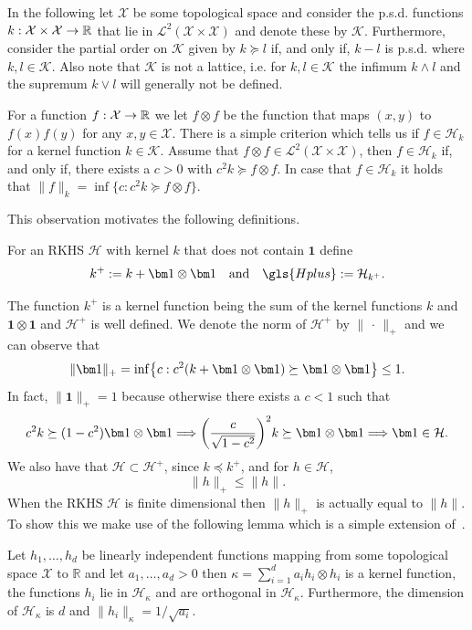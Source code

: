 \documentclass[AHL,Unicode,longabstracts,published]{cedram}
\theoremstyle{remark}
\newcommand{\R}{\mathbb{R}}
\newcommand{\X}{\mathcal{X}}
\newcommand{\cH}{\mathcal{H}}
\newcommand{\clL}{\mathcal{L}}
\newcommand{\clK}{\mathcal{K}}
\renewcommand*{\to}{\mathchoice{\longrightarrow}{\rightarrow}{\rightarrow}{\rightarrow}}
\renewcommand*{\implies}{\mathchoice{\Longrightarrow}{\Rightarrow}{\Rightarrow}{\Rightarrow}}
\let\originalleft\left
\let\originalright\right
\renewcommand{\left}{\mathopen{}\mathclose\bgroup\originalleft}
\renewcommand{\right}{\aftergroup\egroup\originalright}
\begin{document}
In the following let $\X$ be some topological space and consider the p.s.d. functions $k:\X \times \X \to \R$ that lie in $\clL^2(\X \times \X)$ and denote these by $\clK$. Furthermore, consider the partial order on $\clK$ given by $k \succeq l$ if, and only if, $k - l$ is p.s.d. where $k,l \in \clK$. Also note that $\clK$ is not a lattice, i.e. for $k,l \in \clK$ the infimum $k\wedge l$ and the supremum $k \vee l$ will generally not be defined.

For a function $f: \X \to \R$ we let $f \otimes f$ be the function that maps $(x,y)$ to $f(x)f(y)$ for any $x, y \in \X$. There is a simple criterion which tells us if $f \in \cH_k$ for a kernel function $k \in \clK$. Assume that $f\otimes f \in \clL^2(\X \times \X)$, then $f\in \cH_k$ if, and only if, there exists a $c>0$ with $c^2 k \succeq f \otimes f$. In case that $f\in \cH_k$ it holds that $\|f\|_k = \inf \{c: c^2 k \succeq f \otimes f\}$.


This observation motivates the following definitions.
\begin{defi}
For an RKHS $\cH$ with kernel $k$ that does not contain $\bm 1$ define
\begin{equation}\label{def:k_plus}
k^+ := k + \bm 1\otimes \bm 1 \quad\text{and}\quad \gls{Hplus} := \cH_{k^+}.
\end{equation}
\end{defi}

The function $k^+$ is a kernel function being the sum of the kernel functions $k$ and $\bm 1 \otimes \bm 1$ and $\cH^+$ is well defined. We denote the norm of $\cH^+$ by $\|\,\cdot\, \|_+$ and we can observe that
\[
\| \bm 1\|_+ = \inf\left\{c : c^2 (k + \bm 1 \otimes \bm 1) \succeq \bm 1 \otimes \bm 1 \right\} \leq 1.
\]
In fact, $\|\bm 1\|_+ = 1$ because otherwise there exists a $c < 1$ such that
\[
c^2 k \succeq (1-c^2) \bm 1 \otimes \bm 1 \implies \left(\frac{c}{\sqrt{1-c^2}}\right)^2 k \succeq \bm 1 \otimes \bm 1 \implies \bm 1 \in \cH.
\]
We also have that $\cH \subset \cH^+$, since $k \preceq k^+$, and for $h\in \cH$,
\begin{equation}\label{eq:order_plus_leq}
\|h\|_+ \leq \|h\|.
\end{equation}
When the RKHS $\cH$ is finite dimensional then $\|h\|_+$ is actually equal to $\|h\|$. To show this we make use of the following lemma which is a simple extension of~\cite[Section~5.3]{PAUL16}.

\begin{lemm}\label{lem:order_orthogonal}
Let $h_1,\dots, h_d$ be linearly independent functions mapping from some topological space $\X$ to $\R$ and let $a_1,\dots, a_d >0$ then $\kappa = \sum_{i=1}^d a_i h_i \otimes h_i$ is a kernel function, the functions $h_i$ lie in $\cH_\kappa$ and are orthogonal in $\cH_\kappa$. Furthermore, the dimension of $\cH_\kappa$ is $d$ and $\|h_i\|_\kappa =1/ \sqrt{a_i}$.
\end{lemm}
\end{document}
